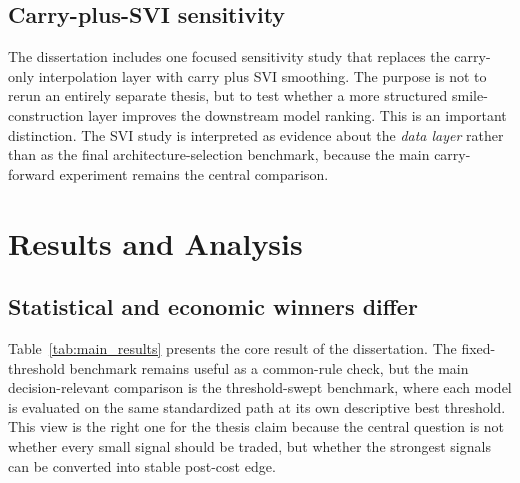 \documentclass[12pt]{report}
\begin{document}
\section{Carry-plus-SVI sensitivity}
The dissertation includes one focused sensitivity study that replaces the carry-only interpolation layer with carry plus SVI smoothing. The purpose is not to rerun an entirely separate thesis, but to test whether a more structured smile-construction layer improves the downstream model ranking. This is an important distinction. The SVI study is interpreted as evidence about the \emph{data layer} rather than as the final architecture-selection benchmark, because the main carry-forward experiment remains the central comparison.

\chapter{Results and Analysis}

\section{Statistical and economic winners differ}
Table~\ref{tab:main_results} presents the core result of the dissertation. The fixed-threshold benchmark remains useful as a common-rule check, but the main decision-relevant comparison is the threshold-swept benchmark, where each model is evaluated on the same standardized path at its own descriptive best threshold. This view is the right one for the thesis claim because the central question is not whether every small signal should be traded, but whether the strongest signals can be converted into stable post-cost edge.
\end{document}
